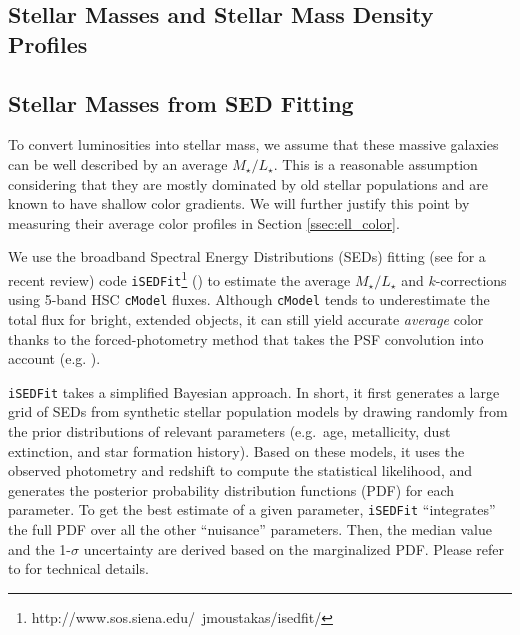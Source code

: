 \documentclass{emulateapj}
\def\cmodel{\texttt{cModel}}
\def\m2l{{$M_{\star}/L_{\star}$}}
\begin{document}
\begin{CJK*}{UTF8}{gbsn}
\section{Stellar Masses and Stellar Mass Density Profiles}
    \label{sec:mstar}
    
\subsection{Stellar Masses from SED Fitting}
    \label{ssec:isedfit}
   
    To convert luminosities into stellar mass, we assume that these massive galaxies 
    can be well described by an average \m2l{}. 
    This is a reasonable assumption considering that they are mostly dominated by 
    old stellar populations and are known to have shallow color gradients. 
    We will further justify this point by measuring their average color profiles in 
    Section \ref{ssec:ell_color}.

    We use the broadband Spectral Energy Distributions (SEDs) fitting 
    (see \citealt{Walcher2011} for a recent review) code 
    \texttt{iSEDFit}\footnote{http://www.sos.siena.edu/~jmoustakas/isedfit/} 
    (\citealt{Moustakas13}) to estimate the average \m2l{} and $k$-corrections using
    5-band HSC \cmodel{} fluxes. 
    Although \cmodel{} tends to underestimate the total flux for bright, extended 
    objects, it can still yield accurate \emph{average} color thanks to the 
    forced-photometry method that takes the PSF convolution into account
    (e.g. \citealt{SynPipeInPrep}). 

    \texttt{iSEDFit} takes a simplified Bayesian approach. 
    In short, it first generates a large grid of SEDs from synthetic stellar population 
    models by drawing randomly from the prior distributions of relevant parameters 
    (e.g.\ age, metallicity, dust extinction, and star formation history).
    Based on these models, it uses the observed photometry and redshift to compute the 
    statistical likelihood, and generates the posterior probability distribution 
    functions (PDF) for each parameter.  
    To get the best estimate of a given parameter, \texttt{iSEDFit} ``integrates'' the 
    full PDF over all the other ``nuisance'' parameters.
    Then, the median value and the 1-$\sigma$ uncertainty are derived based on the 
    marginalized PDF. 
    Please refer to \citet{Moustakas13} for technical details. 
    

\end{CJK*}
\end{document}
